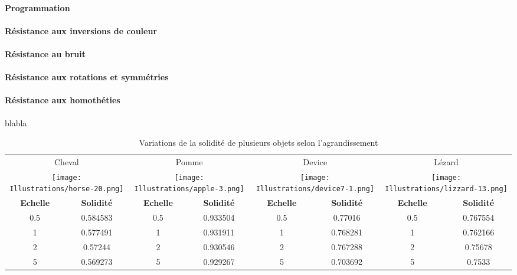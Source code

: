 \documentclass{article}
\begin{document}
	\paragraph{Programmation}
	
	\paragraph{Résistance aux inversions de couleur}
	
	\paragraph{Résistance au bruit}
	

	
	\paragraph{Résistance aux rotations et symmétries}
      
	\paragraph{Résistance aux homothéties} blabla \\
	
	  \begin{table}
	  \centering
	  \begin{tabular}{|c|c|c|c|c|c|c|c|}
	    \hline
	    \multicolumn{2}{|c|}{Cheval} & \multicolumn{2}{|c|}{Pomme} & \multicolumn{2}{|c|}{Device} & \multicolumn{2}{|c|}{Lézard} \\
	    \multicolumn{2}{|c|}{\texttt{[image: Illustrations/horse-20.png]}} 
	    & \multicolumn{2}{|c|}{\texttt{[image: Illustrations/apple-3.png]}} 
	    & \multicolumn{2}{|c|}{\texttt{[image: Illustrations/device7-1.png]}} 
	    & \multicolumn{2}{|c|}{\texttt{[image: Illustrations/lizzard-13.png]}} \\
	    \hline
	    \textbf{Echelle} & \textbf{Solidité} & \textbf{Echelle} & \textbf{Solidité} & \textbf{Echelle} & \textbf{Solidité} & \textbf{Echelle} & \textbf{Solidité} \\
	    \hline
	    0.5 & 0.584583 & 0.5 & 0.933504 & 0.5 & 0.77016 & 0.5 & 0.767554 \\
	    \hline
	    1 & 0.577491 & 1 & 0.931911 & 1 & 0.768281 & 1 & 0.762166 \\
	    \hline
	    2 & 0.57244 & 2 & 0.930546 & 2 & 0.767288 & 2 & 0.75678 \\
	    \hline
	    5 & 0.569273 & 5 & 0.929267 & 5 & 0.703692 & 5 & 0.7533 \\
	    \hline
	  \end{tabular}
	  \caption{Variations de la solidité de plusieurs objets selon l'agrandissement}
	  \label{solidité-scaling-table}
	  \end{table}
	  
\end{document}
